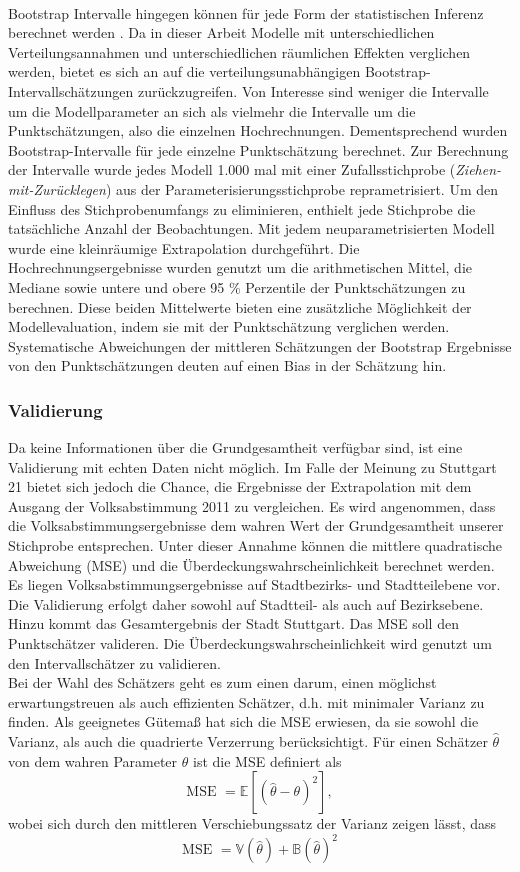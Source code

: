 \documentclass{Vorlage}
\begin{document}
\\Bootstrap Intervalle hingegen können für jede Form der statistischen Inferenz berechnet werden \cite{diciccio1996}. Da in dieser Arbeit Modelle mit unterschiedlichen Verteilungsannahmen und unterschiedlichen räumlichen Effekten verglichen werden, bietet es sich an auf die verteilungsunabhängigen Bootstrap-Intervallschätzungen zurückzugreifen. Von Interesse sind weniger die Intervalle um die Modellparameter an sich als vielmehr die Intervalle um die Punktschätzungen, also die einzelnen Hochrechnungen. Dementsprechend wurden Bootstrap-Intervalle für jede einzelne Punktschätzung berechnet. Zur Berechnung der Intervalle wurde jedes Modell 1.000 mal mit einer Zufallsstichprobe (\textit{Ziehen-mit-Zurücklegen}) aus der Parameterisierungsstichprobe reprametrisiert. Um den Einfluss des Stichprobenumfangs zu eliminieren, enthielt jede Stichprobe die tatsächliche Anzahl der Beobachtungen. Mit jedem neuparametrisierten Modell wurde eine kleinräumige Extrapolation durchgeführt. Die Hochrechnungsergebnisse wurden genutzt um die arithmetischen Mittel, die Mediane sowie untere und obere 95 \% Perzentile der Punktschätzungen zu berechnen. Diese beiden Mittelwerte bieten eine zusätzliche Möglichkeit der Modellevaluation, indem sie mit der Punktschätzung verglichen werden. Systematische Abweichungen der mittleren Schätzungen der Bootstrap Ergebnisse von den Punktschätzungen deuten auf einen Bias in der Schätzung hin.

\subsubsection{Validierung}
Da keine Informationen über die Grundgesamtheit verfügbar sind, ist eine Validierung mit echten Daten nicht möglich. Im Falle der Meinung zu Stuttgart 21 bietet sich jedoch die Chance, die Ergebnisse der Extrapolation mit dem Ausgang der Volksabstimmung 2011 \cite{Amt} zu vergleichen. Es wird angenommen, dass die Volksabstimmungsergebnisse dem wahren Wert der Grundgesamtheit unserer Stichprobe entsprechen. Unter dieser Annahme können die mittlere quadratische Abweichung (MSE) und die Überdeckungswahrscheinlichkeit berechnet werden. Es liegen Volksabstimmungsergebnisse auf Stadtbezirks- und Stadtteilebene vor. Die Validierung erfolgt daher sowohl auf Stadtteil- als auch auf Bezirksebene. Hinzu kommt das Gesamtergebnis der Stadt Stuttgart. Das MSE soll den Punktschätzer valideren. Die Überdeckungswahrscheinlichkeit wird genutzt um den Intervallschätzer zu validieren.\\
Bei der Wahl des Schätzers geht es zum einen darum, einen möglichst erwartungstreuen als auch effizienten Schätzer, d.h. mit minimaler Varianz zu finden. Als geeignetes Gütemaß hat sich die MSE erwiesen, da sie sowohl die Varianz, als 
auch die quadrierte Verzerrung berücksichtigt. Für einen Schätzer $\hat{\theta}$ von dem wahren Parameter $\theta$ ist die MSE definiert als
$$
\text{MSE } = \mathbb{E}[(\hat{\theta} - \theta)^2],
$$
wobei sich durch den mittleren Verschiebungssatz der Varianz zeigen lässt, dass
$$
\text{MSE } = \mathbb{V}(\hat{\theta}) + \mathbb{B}(\hat{\theta})^2
$$
\end{document}
